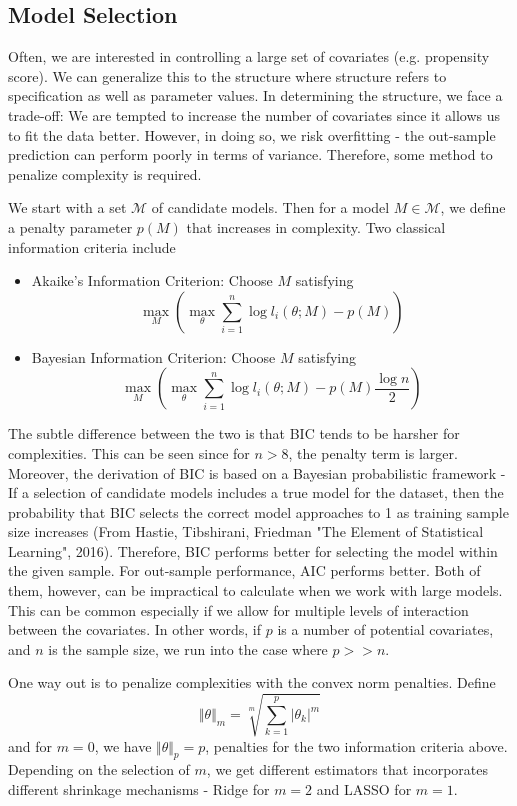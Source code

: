 \documentclass[12pt]{article}
\theoremstyle{definition}
\theoremstyle{property}
\theoremstyle{assumption}
\theoremstyle{example}
\theoremstyle{comment}
\begin{document}
\subsection{Model Selection}
Often, we are interested in controlling a large set of covariates (e.g. propensity score). We can generalize this to the structure where structure refers to specification as well as parameter values. In determining the structure, we face a trade-off: We are tempted to increase the number of covariates since it allows us to fit the data better. However, in doing so, we risk overfitting - the out-sample prediction can perform poorly in terms of variance. Therefore, some method to penalize complexity is required. 
\par
We start with a set $\mathcal{M}$ of candidate models. Then for a model $M\in\mathcal{M}$, we define a penalty parameter $p(M)$ that increases in complexity. Two classical information criteria include
\begin{itemize}
\item Akaike's Information Criterion: Choose $M$ satisfying
\[
\max_{M}\left(\max_\theta \sum_{i=1}^n \log{l_i(\theta;M)}-p(M) \right)
\]
\item Bayesian Information Criterion: Choose $M$ satisfying
\[
\max_{M}\left(\max_\theta \sum_{i=1}^n \log{l_i(\theta;M)}-p(M)\frac{\log{n}}{2} \right)
\]
\end{itemize}
The subtle difference between the two is that BIC tends to be harsher for complexities. This can be seen since for $n>8$, the penalty term is larger. Moreover, the derivation of BIC is based on a Bayesian probabilistic framework - If a selection of candidate models includes a true model for the dataset, then the probability that BIC selects the correct model approaches to 1 as training sample size increases (From Hastie, Tibshirani, Friedman "The Element of Statistical Learning", 2016). Therefore, BIC performs better for selecting the model within the given sample. For out-sample performance, AIC performs better. Both of them, however, can be impractical to calculate when we work with large models. This can be common especially if we allow for multiple levels of interaction between the covariates. In other words, if $p$ is a number of potential covariates, and $n$ is the sample size, we run into the case where $p>>n$. \par
One way out is to penalize complexities with the convex norm penalties. Define
\[
\Vert \theta \Vert _m = \sqrt[m]{\sum_{k=1}^p \vert \theta_k \vert ^m}
\]
and for $m=0$, we have $\Vert \theta \Vert _p=p$, penalties for the two information criteria above. Depending on the selection of $m$, we get different estimators that incorporates different shrinkage mechanisms - Ridge for $m=2$ and LASSO for $m=1$. \par
\end{document}
